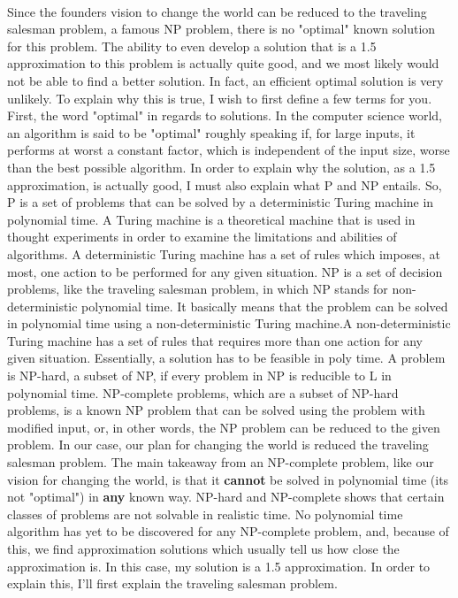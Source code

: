 \documentclass[12pt]{article}
\begin{document}
\\ Since the founders vision to change the world can be reduced to the traveling salesman problem, a famous NP problem, there is no "optimal" known solution for this problem. The ability to even develop a solution that is a 1.5 approximation to this problem is actually quite good, and we most likely would not be able to find a better solution. In fact, an efficient optimal solution is very unlikely. To explain why this is true, I wish to first define a few terms for you. First, the word "optimal" in regards to solutions. In the computer science world, an algorithm is said to be "optimal" roughly speaking if, for large inputs, it performs at worst a constant factor, which is independent of the input size, worse than the best possible algorithm. In order to explain why the solution, as a 1.5 approximation, is actually good, I must also explain what P and NP entails. So, P is a set of problems that can be solved by a deterministic Turing machine in polynomial time. A Turing machine is a theoretical machine that is used in thought experiments in order to examine the limitations and abilities of algorithms. A deterministic Turing machine has a set of rules which imposes, at most, one action to be performed for any given situation. NP is a set of decision problems, like the traveling salesman problem, in which NP stands for non-deterministic polynomial time. It basically means that the problem can be solved in polynomial time using a non-deterministic Turing machine.A non-deterministic Turing machine has a set of rules that requires more than one action for any given situation. Essentially, a solution has to be feasible in poly time. A problem is NP-hard, a subset of NP, if every problem in NP is reducible to L in polynomial time. NP-complete problems, which are a subset of NP-hard problems, is a known NP problem that can be solved using the problem with modified input, or, in other words, the NP problem can be reduced to the given problem. In our case, our plan for changing the world is reduced the traveling salesman problem. The main takeaway from an NP-complete problem, like our vision for changing the world, is that it \textbf{cannot} be solved in polynomial time (its not "optimal") in \textbf{any} known way. NP-hard and NP-complete shows that certain classes of problems are not solvable in realistic time. No polynomial time algorithm has yet to be discovered for any NP-complete problem, and, because of this, we find approximation solutions which usually tell us how close the approximation is. In this case, my solution is a 1.5 approximation. In order to explain this, I'll first explain the traveling salesman problem. \\
\end{document}
